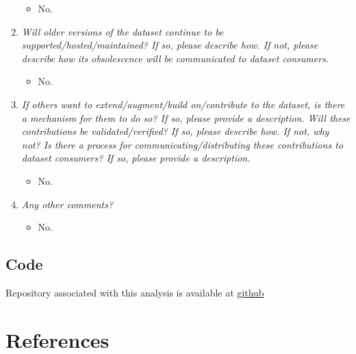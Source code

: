 \documentclass[
]{article}
\providecommand{\tightlist}{%
  \setlength{\itemsep}{0pt}\setlength{\parskip}{0pt}}
\begin{document}
\begin{enumerate}
  \begin{itemize}
  \tightlist
  \item
    No.
  \end{itemize}
\item
  \emph{Will older versions of the dataset continue to be
  supported/hosted/maintained? If so, please describe how. If not,
  please describe how its obsolescence will be communicated to dataset
  consumers.}

  \begin{itemize}
  \tightlist
  \item
    No.
  \end{itemize}
\item
  \emph{If others want to extend/augment/build on/contribute to the
  dataset, is there a mechanism for them to do so? If so, please provide
  a description. Will these contributions be validated/verified? If so,
  please describe how. If not, why not? Is there a process for
  communicating/distributing these contributions to dataset consumers?
  If so, please provide a description.}

  \begin{itemize}
  \tightlist
  \item
    No.
  \end{itemize}
\item
  \emph{Any other comments?}

  \begin{itemize}
  \tightlist
  \item
    No.
  \end{itemize}
\end{enumerate}

\hypertarget{code}{%
\subsection*{Code}\label{code}}

Repository associated with this analysis is available at
\href{https://github.com/Jon-Goodwin/Final}{github}

\newpage

\hypertarget{references}{%
\section*{References}\label{references}}
\end{document}
